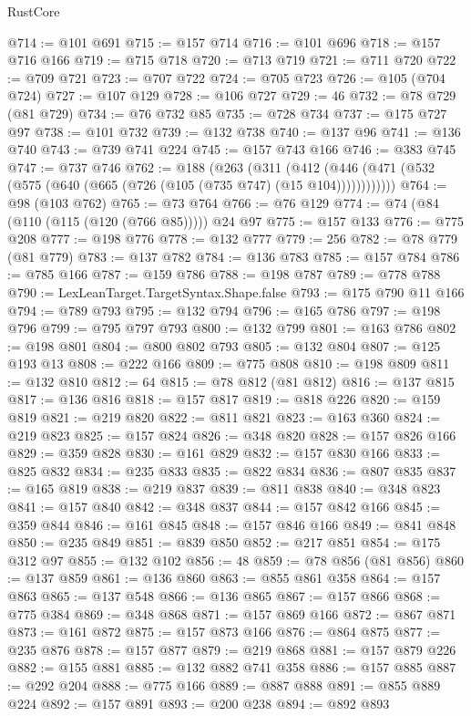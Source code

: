 \begin{lexlean}{RustCore}
\begin{coremodule}
@714 := @101 @691
@715 := @157 @714
@716 := @101 @696
@718 := @157 @716 @166
@719 := @715 @718
@720 := @713 @719
@721 := @711 @720
@722 := @709 @721
@723 := @707 @722
@724 := @705 @723
@726 := @105 (@704 @724)
@727 := @107 @129
@728 := @106 @727
@729 := 46
@732 := @78 @729 (@81 @729)
@734 := @76 @732 @85
@735 := @728 @734
@737 := @175 @727 @97
@738 := @101 @732
@739 := @132 @738
@740 := @137 @96
@741 := @136 @740
@743 := @739 @741 @224
@745 := @157 @743 @166
@746 := @383 @745
@747 := @737 @746
@762 := @188
    (@263
      (@311 (@412 (@446 (@471 (@532 (@575 (@640 (@665 (@726 (@105 (@735 @747) (@15 @104))))))))))))
@764 := @98 (@103 @762)
@765 := @73 @764
@766 := @76 @129
@774 := @74 (@84 (@110 (@115 (@120 (@766 @85))))) @24 @97
@775 := @157 @133
@776 := @775 @208
@777 := @198 @776
@778 := @132 @777
@779 := 256
@782 := @78 @779 (@81 @779)
@783 := @137 @782
@784 := @136 @783
@785 := @157 @784
@786 := @785 @166
@787 := @159 @786
@788 := @198 @787
@789 := @778 @788
@790 := LexLeanTarget.TargetSyntax.Shape.false
@793 := @175 @790 @11 @166
@794 := @789 @793
@795 := @132 @794
@796 := @165 @786
@797 := @198 @796
@799 := @795 @797 @793
@800 := @132 @799
@801 := @163 @786
@802 := @198 @801
@804 := @800 @802 @793
@805 := @132 @804
@807 := @125 @193 @13
@808 := @222 @166
@809 := @775 @808
@810 := @198 @809
@811 := @132 @810
@812 := 64
@815 := @78 @812 (@81 @812)
@816 := @137 @815
@817 := @136 @816
@818 := @157 @817
@819 := @818 @226
@820 := @159 @819
@821 := @219 @820
@822 := @811 @821
@823 := @163 @360
@824 := @219 @823
@825 := @157 @824
@826 := @348 @820
@828 := @157 @826 @166
@829 := @359 @828
@830 := @161 @829
@832 := @157 @830 @166
@833 := @825 @832
@834 := @235 @833
@835 := @822 @834
@836 := @807 @835
@837 := @165 @819
@838 := @219 @837
@839 := @811 @838
@840 := @348 @823
@841 := @157 @840
@842 := @348 @837
@844 := @157 @842 @166
@845 := @359 @844
@846 := @161 @845
@848 := @157 @846 @166
@849 := @841 @848
@850 := @235 @849
@851 := @839 @850
@852 := @217 @851
@854 := @175 @312 @97
@855 := @132 @102
@856 := 48
@859 := @78 @856 (@81 @856)
@860 := @137 @859
@861 := @136 @860
@863 := @855 @861 @358
@864 := @157 @863
@865 := @137 @548
@866 := @136 @865
@867 := @157 @866
@868 := @775 @384
@869 := @348 @868
@871 := @157 @869 @166
@872 := @867 @871
@873 := @161 @872
@875 := @157 @873 @166
@876 := @864 @875
@877 := @235 @876
@878 := @157 @877
@879 := @219 @868
@881 := @157 @879 @226
@882 := @155 @881
@885 := @132 @882 @741 @358
@886 := @157 @885
@887 := @292 @204
@888 := @775 @166
@889 := @887 @888
@891 := @855 @889 @224
@892 := @157 @891
@893 := @200 @238
@894 := @892 @893

\end{coremodule}
\end{lexlean}
